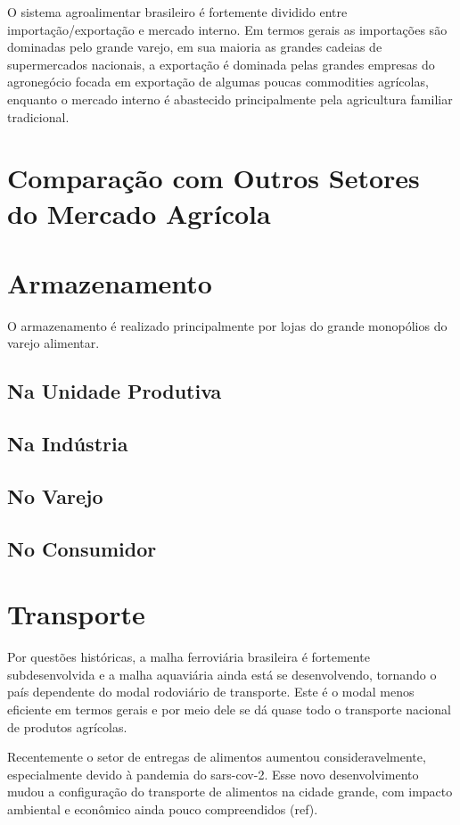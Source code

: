 \documentclass[]{article}
\begin{document}
		O sistema agroalimentar brasileiro é fortemente dividido entre importação/exportação e mercado interno. Em termos gerais as importações são dominadas pelo grande varejo, em sua maioria as grandes cadeias de supermercados nacionais, a exportação é dominada pelas grandes empresas do agronegócio focada em exportação de algumas poucas commodities agrícolas, enquanto o mercado interno é abastecido principalmente pela agricultura familiar tradicional. 
	

	\section{Comparação com Outros Setores do Mercado Agrícola}

	\section{Armazenamento}
		O armazenamento é realizado principalmente por lojas do grande monopólios do varejo alimentar.
		
	\subsection{Na Unidade Produtiva}
	
	\subsection{Na Indústria}
	
	\subsection{No Varejo}
	\subsection{No Consumidor}
		
	\section{Transporte}
		Por questões históricas, a malha ferroviária brasileira é fortemente subdesenvolvida e a malha aquaviária ainda está se desenvolvendo, tornando o país dependente do modal rodoviário de transporte. Este é o modal menos eficiente em termos gerais e por meio dele se dá quase todo o transporte nacional de produtos agrícolas. 

Recentemente o setor de entregas de alimentos aumentou consideravelmente, especialmente devido à pandemia do sars-cov-2. Esse novo desenvolvimento mudou a configuração do transporte de alimentos na cidade grande, com impacto ambiental e econômico ainda pouco compreendidos (ref). 
\end{document}
